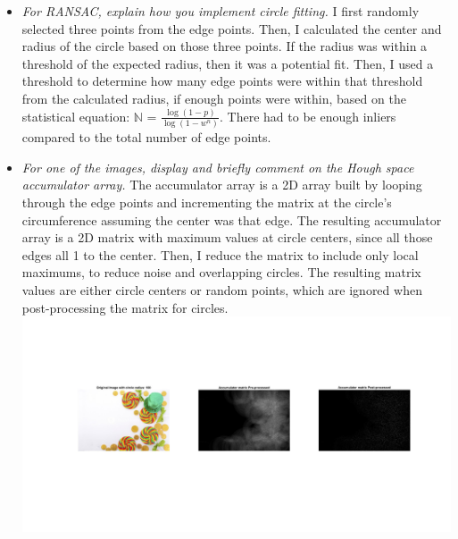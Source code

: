 \documentclass[11pt]{article}
\begin{document}
\begin{itemize}
        \item \textit{For RANSAC, explain how you implement circle fitting.}\newline
        I first randomly selected three points from the edge points. Then, I calculated the center and radius of the
        circle based on those three points. If the radius was within a threshold of the expected radius, then it was
        a potential fit. Then, I used a threshold to determine how many edge points were within that threshold from
        the calculated radius, if enough points were within, based on the statistical equation:
        $\mathbb{N}$ = $\frac{\log(1 - p)}{\log(1 - w^n)}$. There had to be enough inliers compared to the total
        number of edge points.\newline

        \item \textit{For one of the images, display and briefly comment on the Hough space accumulator array.}\newline
        The accumulator array is a 2D array built by looping through the edge points and incrementing the matrix at
        the circle's circumference assuming the center was that edge. The resulting accumulator array is a 2D matrix
        with maximum values at circle centers, since all those edges all 1 to the center. Then, I reduce the matrix
        to include only local maximums, to reduce noise and overlapping circles. The resulting matrix values are
        either circle centers or random points, which are ignored when post-processing the matrix for circles.\newline
        \includegraphics[width=\textwidth]{Output Pictures/hough_accumulator}\newline


\end{itemize}
\end{document}
